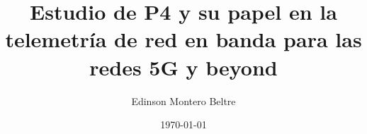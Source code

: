 \documentclass[12pt,a4paper]{report}
\begin{document}
\title{Estudio de P4 y su papel en la telemetría de red en banda para las redes 5G y beyond}
\author{Edinson Montero Beltre}
\date{\today}

\maketitle




\tableofcontents
\cleardoublepage

\listoffigures
\cleardoublepage

\listoftables
\cleardoublepage









\cleardoublepage



\appendix

\end{document}
